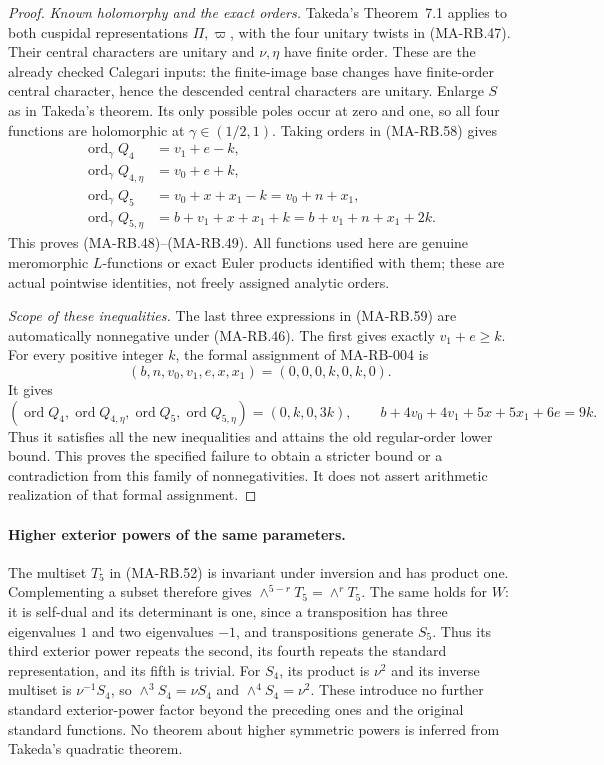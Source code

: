 \begin{proof}
\emph{Known holomorphy and the exact orders.}
Takeda's Theorem~7.1 applies to both cuspidal representations
\(\Pi,\varpi\), with the four unitary twists in (MA-RB.47).
Their central characters are unitary and \(\nu,\eta\)
have finite order. These are the already checked
Calegari inputs: the finite-image base changes have
finite-order central character, hence the descended
central characters are unitary. Enlarge \(S\) as in
Takeda's theorem. Its only possible poles occur at
zero and one, so all four functions are holomorphic at
\(\gamma\in(1/2,1)\).
Taking orders in (MA-RB.58) gives
\[
 \begin{split}
 \operatorname{ord}_\gamma Q_4&=v_1+e-k,\\
 \operatorname{ord}_\gamma Q_{4,\eta}&=v_0+e+k,\\
 \operatorname{ord}_\gamma Q_5&=v_0+x+x_1-k=v_0+n+x_1,\\
 \operatorname{ord}_\gamma Q_{5,\eta}
             &=b+v_1+x+x_1+k=b+v_1+n+x_1+2k .
 \end{split}
 \tag{MA-RB.59}
\]
This proves (MA-RB.48)--(MA-RB.49). All functions used
here are genuine meromorphic \(L\)-functions or exact
Euler products identified with them; these are actual
pointwise identities, not freely assigned analytic orders.

\emph{Scope of these inequalities.}
The last three expressions in (MA-RB.59) are
automatically nonnegative under (MA-RB.46). The first
gives exactly \(v_1+e\ge k\). For every positive integer
\(k\), the formal assignment of MA-RB-004 is
\[
       (b,n,v_0,v_1,e,x,x_1)=(0,0,0,k,0,k,0).
\]
It gives
\[
 (\operatorname{ord}Q_4,\operatorname{ord}Q_{4,\eta},
       \operatorname{ord}Q_5,\operatorname{ord}Q_{5,\eta})
      =(0,k,0,3k),\qquad
 b+4v_0+4v_1+5x+5x_1+6e=9k .
 \tag{MA-RB.60}
\]
Thus it satisfies all the new inequalities and attains
the old regular-order lower bound. This proves the
specified failure to obtain a stricter bound or a
contradiction from this family of nonnegativities.
It does not assert arithmetic realization of that
formal assignment.
\end{proof}

\paragraph{Higher exterior powers of the same parameters.}
The multiset \(T_5\) in (MA-RB.52) is invariant under
inversion and has product one. Complementing a subset
therefore gives \(\wedge^{5-r}T_5=\wedge^rT_5\).
The same holds for \(W\): it is self-dual and its
determinant is one, since a transposition has three
eigenvalues \(1\) and two eigenvalues \(-1\), and
transpositions generate \(S_5\). Thus its third exterior
power repeats the second, its fourth repeats the
standard representation, and its fifth is trivial.
For \(S_4\), its product is \(\nu^2\) and its inverse
multiset is \(\nu^{-1}S_4\), so
\(\wedge^3S_4=\nu S_4\) and \(\wedge^4S_4=\nu^2\).
These introduce no further standard exterior-power
factor beyond the preceding ones and the original
standard functions. No theorem about higher symmetric
powers is inferred from Takeda's quadratic theorem.

